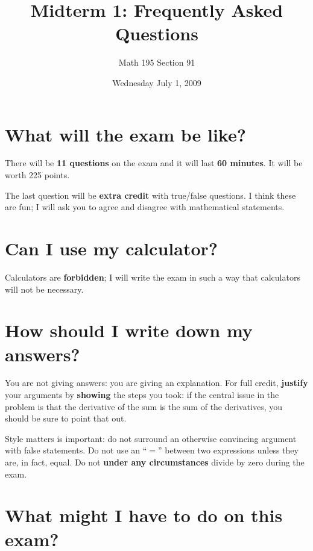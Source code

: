 \documentclass[12pt]{article}
\title{Midterm 1: Frequently Asked Questions}
\author{Math 195 Section 91}
\date{Wednesday July 1, 2009}
\begin{document}
\maketitle

\section*{What will the exam be like?}

There will be \textbf{11 questions} on the exam and it will last
\textbf{60 minutes}.  It will be worth 225 points.

The last question will be \textbf{extra credit} with true/false
questions.  I think these are fun; I will ask you to agree and
disagree with mathematical statements.

\section*{Can I use my calculator?}

Calculators are \textbf{forbidden}; I will write the exam in such a
way that calculators will not be necessary.

\section*{How should I write down my answers?}

You are not giving answers: you are giving an explanation.  For full
credit, \textbf{justify} your arguments by \textbf{showing} the steps
you took: if the central issue in the problem is that the derivative
of the sum is the sum of the derivatives, you should be sure to point
that out.


Style matters is important: do not surround an otherwise convincing
argument with false statements.  Do not use an ``$=$'' between two
expressions unless they are, in fact, equal.  Do not \textbf{under any
  circumstances} divide by zero during the exam.

\section*{What might I have to do on this exam?}
\end{document}
